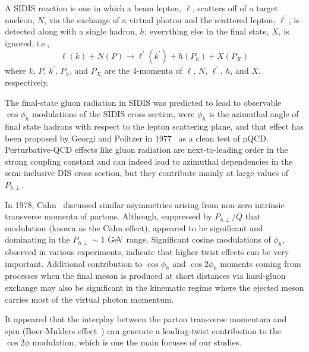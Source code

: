 \documentclass[aps,prl,twocolumn,showpacs,superscriptaddress,groupedaddress]{revtex4}  %
\newcommand{\Phperp}{P_{h\perp}}
\begin{document}
A SIDIS reaction is one in which a beam lepton, $\ell$, scatters off of a target nucleon, $N$, via the exchange of a virtual photon and the scattered lepton, $\ell^{\prime}$, is detected along with a single hadron, $h$; everything else in the final state, $X$, is ignored, i.e.,
\begin{equation}
\label{eq:sidis}
\ell (k) + N(P) \rightarrow \ell^{\prime} (k^{\prime} ) + h(P_{h}) + X(P_{X})
\end{equation}
where $k$, $P$, $k^{\prime}$, $P_{h}$, and $P_{X}$ are the 4-momenta of $\ell$, $N$, $\ell^{\prime}$, $h$, and $X$, respectively.

 The final-state gluon radiation in SIDIS  was predicted to lead to observable $\cos\phi_h$ modulations of the SIDIS cross section,
were $\phi_h$ is the azimuthal angle of final state hadrons with respect to the lepton scattering plane,
and that effect has been  proposed by Georgi and Politzer in  1977~\cite{Georgi:1977tv}  as a clean test of pQCD.
Perturbative-QCD effects like gluon radiation are next-to-leading order in the strong coupling constant and can indeed lead to azimuthal
dependencies in the semi-inclusive DIS cross section, but they contribute mainly at large values of $\Phperp$.

In 1978, Cahn~\cite{Cahn:1978se}   discussed  similar asymmetries arising from non-zero intrinsic transverse momenta
of partons. Although, suppressed by $P_{h\perp}/Q$  that modulation (known as the Cahn effect), 
appeared to be significant and dominating in the $P_{h\perp} \sim $1 GeV range.
Significant cosine modulations of $\phi_h$, observed in various experiments, indicate that higher twist effects can be very important.
Additional contribution to $\cos \phi_h$ and $\cos 2\phi_h$ moments coming from processes when the final meson
is produced at short distances via hard-gluon exchange \cite{Berger:1979xz} may also be 
significant in the kinematic regime where the ejected meson carries  most of 
the virtual photon momentum.

It appeared  that the interplay between the parton transverse momentum and spin
(Boer-Mulders effect~\cite{Boer:1997nt}) can generate a leading-twist
contribution to the $\cos 2\phi$ modulation, which is one the main focuses of our studies.
\end{document}
